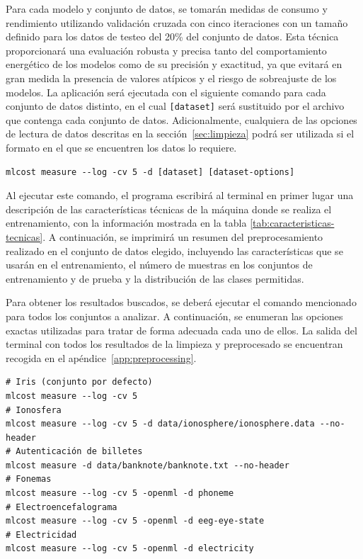 Para cada modelo y conjunto de datos, se tomarán medidas de consumo y rendimiento utilizando validación cruzada con cinco iteraciones con un tamaño definido para los datos de testeo del 20\% del conjunto de datos. Esta técnica proporcionará una evaluación robusta y precisa tanto del comportamiento energético de los modelos como de su precisión y exactitud, ya que evitará en gran medida la presencia de valores atípicos y el riesgo de sobreajuste de los modelos. La aplicación será ejecutada con el siguiente comando para cada conjunto de datos distinto, en el cual \texttt{[dataset]} será sustituido por el archivo que contenga cada conjunto de datos. Adicionalmente, cualquiera de las opciones de lectura de datos descritas en la sección~\ref{sec:limpieza} podrá ser utilizada si el formato en el que se encuentren los datos lo requiere.
\begin{verbatim}
mlcost measure --log -cv 5 -d [dataset] [dataset-options]
\end{verbatim}

Al ejecutar este comando, el programa escribirá al terminal en primer lugar una descripción de las características técnicas de la máquina donde se realiza el entrenamiento, con la información mostrada en la tabla \ref{tab:caracteristicas-tecnicas}. A continuación, se imprimirá un resumen del preprocesamiento realizado en el conjunto de datos elegido, incluyendo las características que se usarán en el entrenamiento, el número de muestras en los conjuntos de entrenamiento y de prueba y la distribución de las clases permitidas.

Para obtener los resultados buscados, se deberá ejecutar el comando mencionado para todos los conjuntos a analizar. A continuación, se enumeran las opciones exactas utilizadas para tratar de forma adecuada cada uno de ellos. La salida del terminal con todos los resultados de la limpieza y preprocesado se encuentran recogida en el apéndice~\ref{app:preprocessing}.

\begin{verbatim}
# Iris (conjunto por defecto)
mlcost measure --log -cv 5
# Ionosfera
mlcost measure --log -cv 5 -d data/ionosphere/ionosphere.data --no-header
# Autenticación de billetes
mlcost measure -d data/banknote/banknote.txt --no-header
# Fonemas
mlcost measure --log -cv 5 -openml -d phoneme
# Electroencefalograma
mlcost measure --log -cv 5 -openml -d eeg-eye-state
# Electricidad
mlcost measure --log -cv 5 -openml -d electricity
\end{verbatim}


